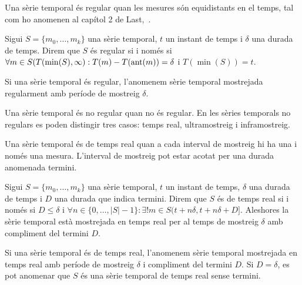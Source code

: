 Una sèrie temporal és regular quan les mesures són equidistants en el temps, tal com ho anomenen al capítol 2 de Last,~\cite{last}.

\begin{definition}
  Sigui $S=\{m_0,\ldots,m_k\}$ una sèrie temporal, $t$ un instant de
  temps i $\delta$ una durada de temps. Direm que $S$ és regular si i
  només si $\forall m \in S(T(\min(S),\infty):T(m) - T(\operatorname*{ant}(m)) = \delta$ i
  $T(\min(S))=t$. 
\end{definition}

Si una sèrie temporal és regular, l'anomenem  sèrie temporal mostrejada
regularment amb període de mostreig $\delta$.


Una sèrie temporal és no regular quan no és regular. 
En les sèries temporals no regulars es poden distingir tres casos: temps real, ultramostreig i inframostreig.

Una sèrie temporal és de temps real quan a cada interval de mostreig hi ha una i només una mesura. L'interval de mostreig pot estar acotat per una durada anomenada termini.

\begin{definition}
  Sigui $S=\{m_0,\dotsc,m_k\}$ una sèrie temporal, $t$ un instant de
  temps, $\delta$ una durada de temps i $D$ una durada que indica
  termini. Direm que $S$ és de temps real si i només si $D\leq\delta$
  i $\forall n\in\{0,\ldots,|S|-1\}: \exists!m \in
  S(t+n\delta,t+n\delta+D]$.  Aleshores la sèrie temporal està
  mostrejada en temps real per al temps de mostreig $\delta$ amb
  compliment del termini $D$.
\end{definition}

Si una sèrie temporal és de temps real, l'anomenem  sèrie temporal mostrejada
en temps real amb període de mostreig $\delta$ i compliment del termini $D$.
Si $D=\delta$, es pot anomenar que $S$ és una sèrie temporal de temps real sense termini.




